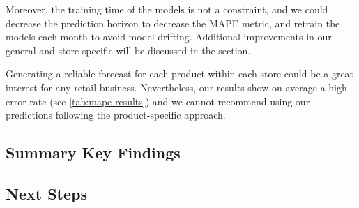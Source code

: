 Moreover, the training time of the models is not a constraint, and we could decrease the prediction horizon to decrease the MAPE metric, and retrain the models each month to avoid model drifting. Additional improvements in our general and store-specific will be discussed in the  section.

Generating a reliable forecast for each product within each store could be a great interest for any retail business. Nevertheless, our results show on average a high error rate (see \autoref{tab:mape-results}) and we cannot recommend using our predictions following the product-specific approach. 


\subsection[Summary Key Findings]{Summary Key Findings}
\label{sec:key-findings}


\subsection[Next Steps]{Next Steps}
\label{sec:next-steps}



